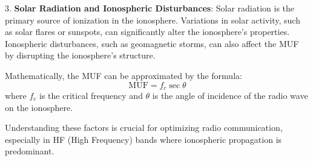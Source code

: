 3. \textbf{Solar Radiation and Ionospheric Disturbances}: Solar radiation is the primary source of ionization in the ionosphere. Variations in solar activity, such as solar flares or sunspots, can significantly alter the ionosphere's properties. Ionospheric disturbances, such as geomagnetic storms, can also affect the MUF by disrupting the ionosphere's structure.

Mathematically, the MUF can be approximated by the formula:
\[ \text{MUF} = f_c \sec \theta \]
where \( f_c \) is the critical frequency and \( \theta \) is the angle of incidence of the radio wave on the ionosphere.

Understanding these factors is crucial for optimizing radio communication, especially in HF (High Frequency) bands where ionospheric propagation is predominant.

